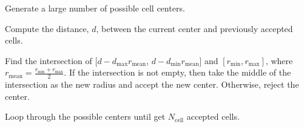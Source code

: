 Generate a large number of possible cell centers.

Compute the  distance, $d$, between the current center and previously accepted cells.

Find the intersection of [$d-d_\text{max} r_\text{mean}$, $d-d_\text{min} r_\text{mean}$] and $[r_\text{min}, r_\text{max}]$, where $r_\text{mean}=\frac{r_\text{min}+r_\text{max}}{2}$. If the intersection is not empty, then take the middle of the intersection as the new radius and accept the new center. Otherwise, reject the center.

Loop through the possible centers until get $N_\text{cell}$ accepted cells.
